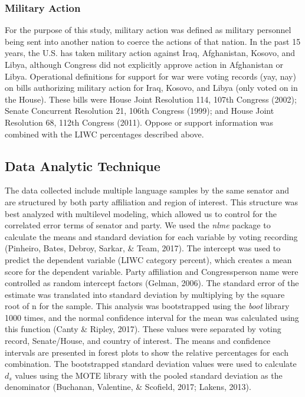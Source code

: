 \documentclass[english,,man,floatsintext]{apa6}
\begin{document}
\hypertarget{military-action}{%
\subsubsection{Military Action}\label{military-action}}

For the purpose of this study, military action was defined as military personnel being sent into another nation to coerce the actions of that nation. In the past 15 years, the U.S. has taken military action against Iraq, Afghanistan, Kosovo, and Libya, although Congress did not explicitly approve action in Afghanistan or Libya. Operational definitions for support for war were voting records (yay, nay) on bills authorizing military action for Iraq, Kosovo, and Libya (only voted on in the House). These bills were House Joint Resolution 114, 107th Congress (2002); Senate Concurrent Resolution 21, 106th Congress (1999); and House Joint Resolution 68, 112th Congress (2011). Oppose or support information was combined with the LIWC percentages described above.

\hypertarget{data-analytic-technique}{%
\subsection{Data Analytic Technique}\label{data-analytic-technique}}

The data collected include multiple language samples by the same senator and are structured by both party affiliation and region of interest. This structure was best analyzed with multilevel modeling, which allowed us to control for the correlated error terms of senator and party. We used the \emph{nlme} package to calculate the means and standard deviation for each variable by voting recording (Pinheiro, Bates, Debroy, Sarkar, \& Team, 2017). The intercept was used to predict the dependent variable (LIWC category percent), which creates a mean score for the dependent variable. Party affiliation and Congressperson name were controlled as random intercept factors (Gelman, 2006). The standard error of the estimate was translated into standard deviation by multiplying by the square root of n for the sample. This analysis was bootstrapped using the \emph{boot} library 1000 times, and the normal confidence interval for the mean was calculated using this function (Canty \& Ripley, 2017). These values were separated by voting record, Senate/House, and country of interest. The means and confidence intervals are presented in forest plots to show the relative percentages for each combination. The bootstrapped standard deviation values were used to calculate \(d_s\) values using the MOTE library with the pooled standard deviation as the denominator (Buchanan, Valentine, \& Scofield, 2017; Lakens, 2013).
\end{document}
